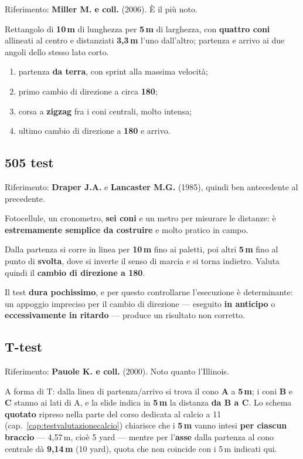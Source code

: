 Riferimento: \textbf{Miller M. e coll.} (2006). È il più noto.

Rettangolo di \textbf{10\,m} di lunghezza per \textbf{5\,m} di larghezza, con \textbf{quattro coni}
allineati al centro e distanziati \textbf{3,3\,m} l'uno dall'altro; partenza e arrivo ai due angoli
dello stesso lato corto.

\begin{enumerate}
  \item partenza \textbf{da terra}, con sprint alla massima velocità;
  \item primo cambio di direzione a circa \textbf{180\textdegree};
  \item corsa a \textbf{zigzag} fra i coni centrali, molto intensa;
  \item ultimo cambio di direzione a \textbf{180\textdegree} e arrivo.
\end{enumerate}

\subsection{505 test}

Riferimento: \textbf{Draper J.A.} e \textbf{Lancaster M.G.} (1985), quindi ben antecedente al
precedente.

Fotocellule, un cronometro, \textbf{sei coni} e un metro per misurare le distanze: è
\textbf{estremamente semplice da costruire} e molto pratico in campo.

Dalla partenza si corre in linea per \textbf{10\,m} fino ai paletti, poi altri \textbf{5\,m} fino
al punto di \textbf{svolta}, dove si inverte il senso di marcia e si torna indietro. Valuta quindi
il \textbf{cambio di direzione a 180\textdegree}.

Il test \textbf{dura pochissimo}, e per questo controllarne l'esecuzione è determinante: un
appoggio impreciso per il cambio di direzione --- eseguito \textbf{in anticipo} o
\textbf{eccessivamente in ritardo} --- produce un risultato non corretto.

\subsection{T-test}

Riferimento: \textbf{Pauole K. e coll.} (2000). Noto quanto l'Illinois.

A forma di T: dalla linea di partenza/arrivo si trova il cono \textbf{A} a \textbf{5\,m}; i coni
\textbf{B} e \textbf{C} stanno ai lati di A, e la slide indica in \textbf{5\,m} la distanza
\textbf{da B a C}. Lo schema \textbf{quotato} ripreso nella parte del corso dedicata al calcio a 11
(cap.~\ref{cap:testvalutazionecalcio}) chiarisce che i \textbf{5\,m} vanno intesi \textbf{per
ciascun braccio} --- 4,57\,m, cioè 5 yard --- mentre per l'\textbf{asse} dalla partenza al cono
centrale dà \textbf{9,14\,m} (10 yard), quota che non coincide con i 5\,m indicati qui.

